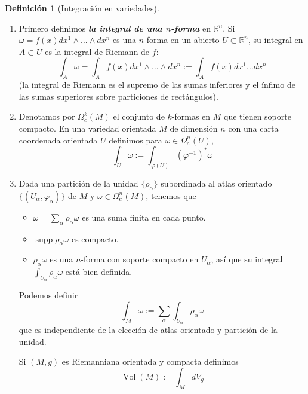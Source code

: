 \documentclass[spanish]{article}
\theoremstyle{definition}
\newtheorem*{defn}{Definición}
\newcommand{\R}{\mathbb{R}}
\DeclareMathOperator{\supp}{supp}
\begin{document}
	\begin{defn}[Integración en variedades]\leavevmode
		\begin{enumerate}
			\item Primero definimos \textit{\textbf{la integral de una $n$-forma}} en $\R^n$. Si $\omega=f(x)dx^1\wedge\ldots\wedge dx^n$ es una $n$-forma en un abierto $U\subset\R^n$, su integral en $A\subset U$ es la integral de Riemann de $f$:
			\[\int_A\omega=\int_Af(x)dx^1\wedge\ldots\wedge dx^n:=\int_Af(x)dx^1\ldots dx^n\]
			(la integral de Riemann es el supremo de las sumas inferiores y el ínfimo de las sumas superiores sobre particiones de rectángulos).
			
			\item Denotamos por $\Omega_c^k(M)$ el conjunto de $k$-formas en $M$ que tienen soporte compacto. En una variedad orientada $M$ de dimensión $n$ con una carta coordenada orientada $U$ definimos para $\omega\in\Omega_c^n(U)$,
			\[\int_U\omega:=\int_{\varphi(U)}(\varphi^{-1})^*\omega\]
			\item Dada una partición de la unidad $\{\rho_\alpha\}$ subordinada al atlas orientado $\{(U_\alpha,\varphi_\alpha)\}$ de $M$ y $\omega\in\Omega_c^n(M)$, tenemos que
			\begin{itemize}
				\item $\omega=\sum_\alpha\rho_\alpha\omega$ es una suma finita en cada punto.
				\item $\supp \rho_\alpha\omega$ es compacto.
				\item $\rho_\alpha\omega$ es una $n$-forma con soporte compacto en $U_\alpha$, así que su integral $\int_{U_\alpha}\rho_\alpha\omega$ está bien definida.
			\end{itemize}
			Podemos definir
			\[\int_M\omega:=\sum_\alpha\int_{U_\alpha}\rho_\alpha\omega\]
			que es independiente de la elección de atlas orientado y partición de la unidad.
			
			Si $(M,g)$ es Riemanniana orientada y compacta definimos
			\[\operatorname{Vol}(M):=\int_MdV_g\]
		\end{enumerate}
	\end{defn}
	
\end{document}
